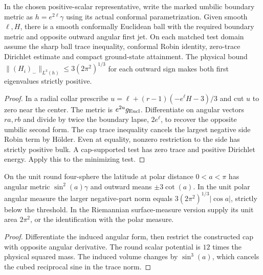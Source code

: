 \begin{proposition}
\label{prop:ed07-robin-cap}
\leanok
In the chosen positive-scalar representative, write the marked umbilic
boundary metric as $h=e^{2\ell}\gamma$ using its actual conformal
parametrization. Given smooth $\ell,H$, there is a smooth conformally
Euclidean ball with the required boundary metric and opposite
outward angular first jet. On each matched test domain assume the
sharp ball trace inequality, conformal Robin identity, zero-trace
Dirichlet estimate and compact ground-state attainment.
The physical bound $\|(H_i)_-\|_{L^3(h)}\le3(2\pi^2)^{1/3}$ for each
outward sign makes both first eigenvalues strictly positive.
\end{proposition}
\begin{proof}
\leanok
In a radial collar prescribe $u=\ell+(r-1)(-e^\ell H-3)/3$ and cut
$u$ to zero near the center. The metric is $e^{2u}g_{\rm Eucl}$.
Differentiate on angular vectors $ra,rb$ and divide by twice the boundary
lapse, $2e^\ell$, to recover the opposite umbilic second form.
The cap trace inequality cancels the largest negative side Robin term
by H\"older. Even at equality, nonzero restriction to the side has
strictly positive bulk. A cap-supported test has zero trace and
positive Dirichlet energy. Apply this to the minimizing test.
\end{proof}

\begin{proposition}
\label{prop:ed52-latitude}
\leanok
On the unit round four-sphere the latitude at polar distance
$0<a<\pi$ has angular metric $\sin^2(a)\gamma$ and outward means
$\pm3\cot(a)$. In the unit polar angular measure the larger negative-part
norm equals $3(2\pi^2)^{1/3}|\cos a|$, strictly below the threshold.
In the Riemannian surface-measure version supply its unit area
$2\pi^2$, or the identification with the polar measure.
\end{proposition}
\begin{proof}
\leanok
Differentiate the induced angular form, then restrict the constructed
cap with opposite angular derivative. The round scalar potential is
$12$ times the physical squared mass. The induced volume changes by
$\sin^3(a)$, which cancels the cubed reciprocal sine in the trace norm.
\end{proof}

